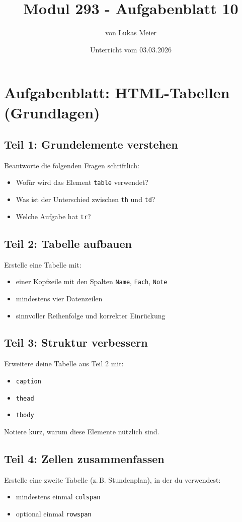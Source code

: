 \documentclass[a4paper,12pt]{article}
\title{Modul 293 - Aufgabenblatt 10}
\author{von Lukas Meier}
\date{Unterricht vom 03.03.2026}
\begin{document}
\maketitle

\section*{Aufgabenblatt: HTML-Tabellen (Grundlagen)}

\subsection*{Teil 1: Grundelemente verstehen}
Beantworte die folgenden Fragen schriftlich:
\begin{itemize}
  \item Wofür wird das Element \texttt{table} verwendet?
  \item Was ist der Unterschied zwischen \texttt{th} und \texttt{td}?
  \item Welche Aufgabe hat \texttt{tr}?
\end{itemize}

\subsection*{Teil 2: Tabelle aufbauen}
Erstelle eine Tabelle mit:
\begin{itemize}
  \item einer Kopfzeile mit den Spalten \texttt{Name}, \texttt{Fach}, \texttt{Note}
  \item mindestens vier Datenzeilen
  \item sinnvoller Reihenfolge und korrekter Einrückung
\end{itemize}

\subsection*{Teil 3: Struktur verbessern}
Erweitere deine Tabelle aus Teil 2 mit:
\begin{itemize}
  \item \texttt{caption}
  \item \texttt{thead}
  \item \texttt{tbody}
\end{itemize}

Notiere kurz, warum diese Elemente nützlich sind.

\subsection*{Teil 4: Zellen zusammenfassen}
Erstelle eine zweite Tabelle (z.\,B. Stundenplan), in der du verwendest:
\begin{itemize}
  \item mindestens einmal \texttt{colspan}
  \item optional einmal \texttt{rowspan}
\end{itemize}
\end{document}

